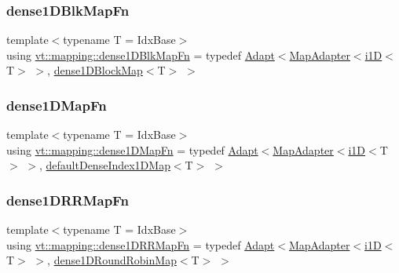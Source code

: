 \subsubsection{\texorpdfstring{dense1\+D\+Blk\+Map\+Fn}{dense1DBlkMapFn}}
{\footnotesize\ttfamily template$<$typename T  = Idx\+Base$>$ \\
using \hyperlink{namespacevt_1_1mapping_a433597bc51c453de93aeb1312676c70c}{vt\+::mapping\+::dense1\+D\+Blk\+Map\+Fn} = typedef \hyperlink{namespacevt_1_1mapping_ab3efa0ad45a85d80210d4acef3bb6c22}{Adapt}$<$\hyperlink{namespacevt_1_1mapping_a41b113c28bb6430fbcb5be66e08ccf9f}{Map\+Adapter}$<$\hyperlink{namespacevt_1_1mapping_af0c14a9a77e0311b3d089143ed93ba76}{i1D}$<$T$>$ $>$, \hyperlink{namespacevt_1_1mapping_a2d49151f03d4ce393b01c620f6b18517}{dense1\+D\+Block\+Map}$<$T$>$ $>$}

\mbox{\label{namespacevt_1_1mapping_aaedaf84c7a2cac3bae6701cc982a76c7}} 
\subsubsection{\texorpdfstring{dense1\+D\+Map\+Fn}{dense1DMapFn}}
{\footnotesize\ttfamily template$<$typename T  = Idx\+Base$>$ \\
using \hyperlink{namespacevt_1_1mapping_aaedaf84c7a2cac3bae6701cc982a76c7}{vt\+::mapping\+::dense1\+D\+Map\+Fn} = typedef \hyperlink{namespacevt_1_1mapping_ab3efa0ad45a85d80210d4acef3bb6c22}{Adapt}$<$\hyperlink{namespacevt_1_1mapping_a41b113c28bb6430fbcb5be66e08ccf9f}{Map\+Adapter}$<$\hyperlink{namespacevt_1_1mapping_af0c14a9a77e0311b3d089143ed93ba76}{i1D}$<$T$>$ $>$, \hyperlink{namespacevt_1_1mapping_ae055a42b89a59fd6d0cc6d40f9abf3b5}{default\+Dense\+Index1\+D\+Map}$<$T$>$ $>$}

\mbox{\label{namespacevt_1_1mapping_a2512459116047e3e14365e1a8f41efd7}} 
\subsubsection{\texorpdfstring{dense1\+D\+R\+R\+Map\+Fn}{dense1DRRMapFn}}
{\footnotesize\ttfamily template$<$typename T  = Idx\+Base$>$ \\
using \hyperlink{namespacevt_1_1mapping_a2512459116047e3e14365e1a8f41efd7}{vt\+::mapping\+::dense1\+D\+R\+R\+Map\+Fn} = typedef \hyperlink{namespacevt_1_1mapping_ab3efa0ad45a85d80210d4acef3bb6c22}{Adapt}$<$\hyperlink{namespacevt_1_1mapping_a41b113c28bb6430fbcb5be66e08ccf9f}{Map\+Adapter}$<$\hyperlink{namespacevt_1_1mapping_af0c14a9a77e0311b3d089143ed93ba76}{i1D}$<$T$>$ $>$, \hyperlink{namespacevt_1_1mapping_a2a4e62c5dc17da0032d3953c7e3cde8b}{dense1\+D\+Round\+Robin\+Map}$<$T$>$ $>$}


